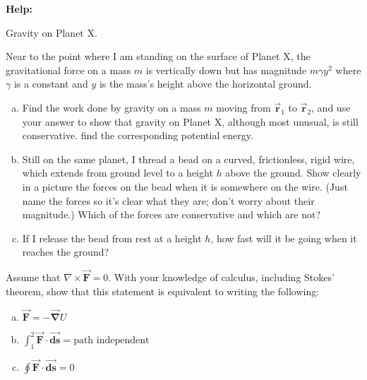 \documentclass[11pt,letterpaper,boxed]{../hmcpsetrhino}
\let\oldvec\vec
\renewcommand{\vec}[1]{\oldvec{\mathbf{#1}}}
\begin{document}
\textbf{Help:} 

\begin{problem}[i]
Gravity on Planet X.

\begin{problem}[4.7]
Near to the point where I am standing on the surface of Planet X, the gravitational force on a mass $m$ is vertically down but has magnitude $m \gamma y^2$ where $\gamma$ is a constant and $y$ is the mass's height above the horizontal ground. 
\begin{enumerate}[(a)]
\item Find the work done by gravity on a mass $m$ moving from $\vec r_1$ to $\vec r_2$, and use your answer to show that gravity on Planet X, although most unusual, is still conservative. find the corresponding potential energy.
\item Still on the same planet, I thread a bead on a curved, frictionless, rigid wire, which extends from ground level to a height $h$ above the ground. Show clearly in a picture the forces on the bead when it is somewhere on the wire. (Just name the forces so it's clear what they are; don't worry about their magnitude.) Which of the forces are conservative and which are not?
\item If I release the bead from rest at a height $h$, how fast will it be going when it reaches the ground?
\end{enumerate}
\end{problem}
\end{problem}

\begin{solution}

\vfill
\end{solution}

\newpage 

\begin{problem}[ii]
Assume that $\nabla \times \vec F = 0$. With your knowledge of calculus, including Stokes' theorem, show that this statement is equivalent to writing the following:

\begin{enumerate}[(a)]
\item $\vec F = - \vec{\nabla} U$

\item $\int_1^2 \vec{F} \cdot \vec{ds} = \text{path independent}$

\item $\oint \vec F \cdot \vec{ds} = 0$

\end{enumerate}

\end{problem}
\end{document}
